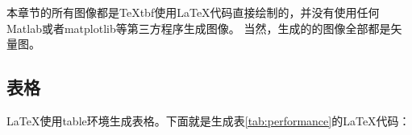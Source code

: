 \documentclass[UTF8]{ctexart}
\numberwithin{equation}{section} %
\numberwithin{table}{section} %
\begin{document}
%

本章节的所有图像都是\TeX tbf{使用\LaTeX  代码直接绘制的}，并没有使用任何Matlab或者matplotlib等第三方程序生成图像。
当然，生成的的图像全部都是矢量图。

\subsection{表格}
\LaTeX 使用table环境生成表格。下面就是生成表\ref{tab:performance}的\LaTeX 代码：
\end{document}
